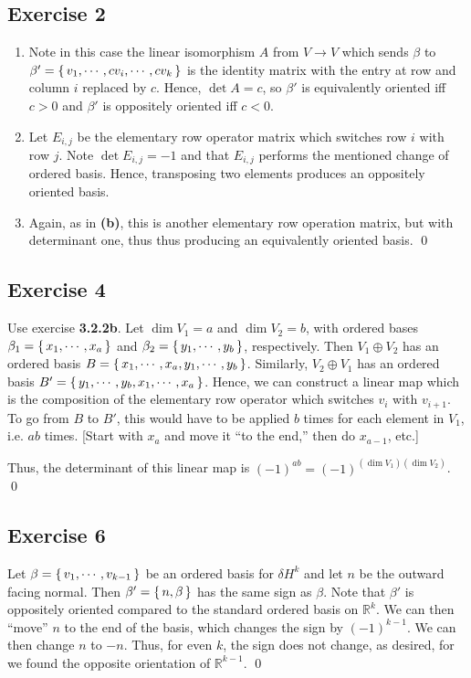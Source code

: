 \documentclass{article}
\newcommand{\R}{\mathbb{R}}
\begin{document}
  \subsection*{Exercise 2}
    \begin{enumerate}[label=\textbf{(\alph*)}]
      \item{
        Note in this case the linear isomorphism $A$ from $V\to V$ which sends
        $\beta$ to $\beta'=\set{v_1,\cdots,cv_i,\cdots,cv_k}$ is the identity
        matrix with the entry at row and column $i$ replaced by $c$. Hence,
        $\det A=c$, so $\beta'$ is equivalently oriented iff $c>0$ and $\beta'$
        is oppositely oriented iff $c<0$.
      }
      \item{
        Let $E_{i,j}$ be the elementary row operator matrix which switches row
        $i$ with row $j$. Note $\det E_{i,j}=-1$ and that $E_{i,j}$ performs the
        mentioned change of ordered basis. Hence, transposing two elements
        produces an oppositely oriented basis.
      }
      \item{
        Again, as in \textbf{(b)}, this is another elementary row operation
        matrix, but with determinant one, thus thus producing an equivalently
        oriented basis.
      }
      \qed
    \end{enumerate}

  \subsection*{Exercise 4}
    Use exercise \textbf{3.2.2b}. Let $\dim V_1=a$ and $\dim V_2=b$, with
    ordered bases $\beta_1=\set{x_1,\cdots,x_a}$ and $\beta_2=\set{y_1,\cdots,
    y_b}$, respectively. Then $V_1\oplus V_2$ has an ordered basis $B=\set{x_1,
    \cdots,x_a,y_1,\cdots,y_b}$. Similarly, $V_2\oplus V_1$ has an ordered basis
    $B'=\set{y_1,\cdots,y_b,x_1,\cdots,x_a}$. Hence, we can construct a linear
    map which is the composition of the elementary row operator which switches
    $v_i$ with $v_{i+1}$. To go from $B$ to $B'$, this would have to be applied
    $b$ times for each element in $V_1$, i.e. $ab$ times. [Start with $x_a$
    and move it ``to the end,'' then do $x_{a-1}$, etc.]

    Thus, the determinant of this linear map is $(-1)^{ab}=(-1)^{(\dim V_1)(\dim
    V_2)}$.
    \qed

  \subsection*{Exercise 6}
    Let $\beta=\set{v_1,\cdots,v_{k-1}}$ be an ordered basis for $\delta H^k$
    and let $n$ be the outward facing normal. Then $\beta'=\set{n,\beta}$ has
    the same sign as $\beta$. Note that $\beta'$ is oppositely oriented compared
    to the standard ordered basis on $\R^k$. We can then ``move'' $n$ to the end
    of the basis, which changes the sign by $(-1)^{k-1}$. We can then change $n$
    to $-n$. Thus, for even $k$, the sign does not change, as desired, for we
    found the opposite orientation of $\R^{k-1}$.
    \qed
\end{document}
